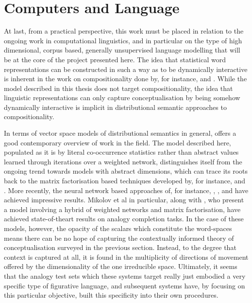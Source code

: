 \section{Computers and Language}
At last, from a practical perspective, this work must be placed in relation to the ongoing work in computational linguistics, and in particular on the type of high dimensional, corpus based, generally unsupervised language modelling that will be at the core of the project presented here.  The idea that statistical word representations can be constructed in such a way as to be dynamically interactive is inherent in the work on compositionality done by, for instance, \cite{CoeckeEA2011} and \cite{GreffenstetteEA2011} \citep[see][for an overview]{MitchellEA2010}.  While the model described in this thesis does not target compositionality, the idea that linguistic representations can only capture conceptualisation by being somehow dynamically interactive is implicit in distributional semantic approaches to compositionality.

In terms of vector space models of distributional semantics in general, \cite{Clark2015} offers a good contemporary overview of work in the field.  The model described here, populated as it is by literal co-occurrence statistics rather than abstract values learned through iterations over a weighted network, distinguishes itself from the ongoing trend towards models with abstract dimensions, which can trace its roots back to the matrix factorisation based techniques developed by, for instance, \cite{DeerwesterEA1990} and \cite{BleiEA2003}.  More recently, the neural network based approaches of, for instance, \cite{BengioEA2003}, \cite{CollobertEA2008}, and \cite{MikolovEA2013} have achieved impressive results.  Mikolov et al in particular, along with \cite{PenningtonEA2014}, who present a model involving a hybrid of weighted networks and matrix factorisation, have achieved state-of-theart results on analogy completion tasks.  In the case of these models, however, the opacity of the scalars which constitute the word-spaces means there can be no hope of capturing the contextually informed theory of conceptualisation surveyed in the previous section.  Instead, to the degree that context is captured at all, it is found in the multiplicity of directions of movement offered by the dimensionality of the one irreducible space.  Ultimately, it seems that the analogy test sets which these systems target really just embodied a very specific type of figurative language, and subsequent systems have, by focusing on this particular objective, built this specificity into their own procedures.


